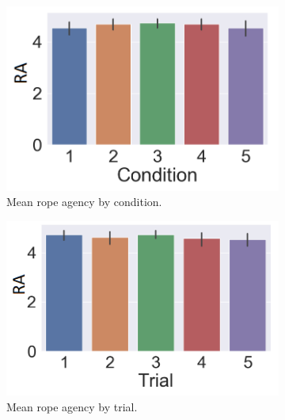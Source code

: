 \begin{figure}[H]
 \begin{subfigure}[b]{0.3\textwidth}
     \centering
     \includegraphics[scale=0.3]{Files/Plots/rocond.png}
     \caption{Mean rope agency by condition.}
     \label{fig:ropeOwnCond}
 \end{subfigure}
  \begin{subfigure}[b]{0.3\textwidth}
     \centering
     \includegraphics[scale=0.3]{Files/Plots/rotrial.png}
     \caption{Mean rope agency by trial.}
     \label{fig:ropeOwnTrial}
 \end{subfigure}
 \begin{subfigure}[b]{0.3\textwidth}
     \centering

\end{subfigure}
\end{figure}
